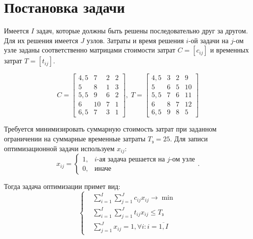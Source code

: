 


	
	
	\setcounter{page}{2}
	\tableofcontents
	\newpage
	

	\section{Постановка задачи}
	
	Имеется $I$ задач, которые должны быть решены последовательно друг за другом. Для их решения имеется $J$ узлов. Затраты и время решения  $i$-ой задачи на $j$-ом узле заданы соответственно матрицами стоимости затрат $C = [c_{ij}]$ и временных затрат $T = [t_{ij}]$.
	
	\begin{equation}
		C = \begin{bmatrix*}
			4,5 & 7  & 2 & 2 \\
			5   & 8  & 1 & 3 \\
			5,5 & 9  & 6 & 2 \\
			6   & 10 & 7 & 1 \\
			6,5 & 7  & 3 & 1
		\end{bmatrix*},\;
		T = \begin{bmatrix*}
			4,5 & 3 & 2 & 9  \\
			5   & 6 & 5 & 10 \\
			5,5 & 7 & 6 & 11 \\
			6   & 8 & 7 & 12 \\
			6,5 & 9 & 8 & 5
		\end{bmatrix*}
		\label{matrices}
	\end{equation}
	
	Требуется минимизировать суммарную стоимость затрат при заданном ограничении на суммарные временные затраты $T_{\text{з}} = 25$. Для записи оптимизационной задачи используем $x_{ij}$:
	\[x_{ij} = \begin{cases}
		1, & i\text{-ая задача решается на }j\text{-ом узле} \\
		0, & \text{иначе}
	\end{cases}.\]

	Тогда задача оптимизации примет вид:
	\begin{equation}
		\left\{\begin{aligned}
			&\sum_{i=1}^{I} \sum_{j=1}^{J} c_{ij} x_{ij} \to \min \\
			&\sum_{i=1}^{I} \sum_{j=1}^{J} t_{ij} x_{ij} \leq T_{\text{з}} \\
			&\sum_{j=1}^{J} x_{ij} = 1, \forall i: i=\overline{1,I}
		\end{aligned}\right.	
		\label{task}
	\end{equation}


